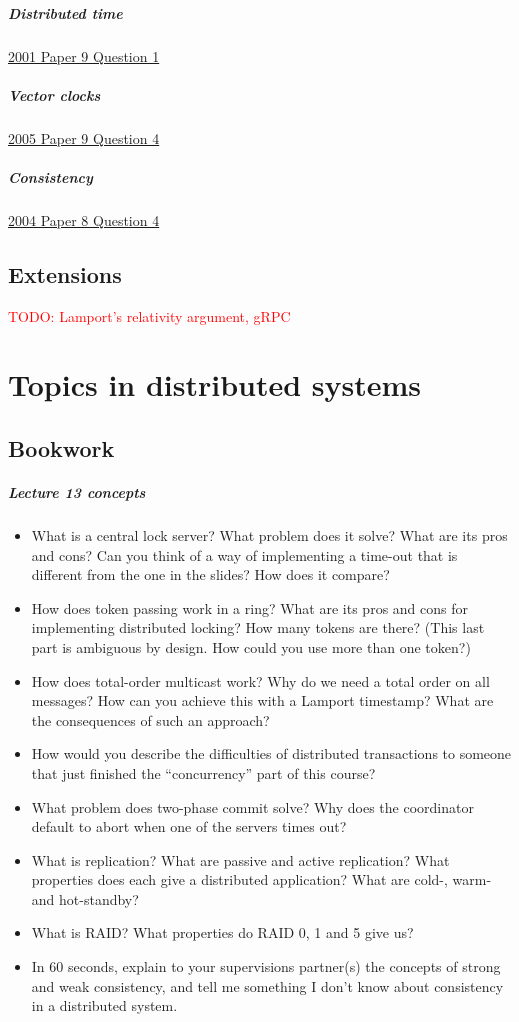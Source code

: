 \documentclass[12pt,a4paper,oneside,openright]{report}
\newcommand{\question}[2]{\paragraph{#1} #2}
\newcommand{\todo}[1]{\textcolor{red}{TODO: #1}}
\begin{document}
\question{Distributed
  time}{\href{https://www.cl.cam.ac.uk/teaching/exams/pastpapers/y2001p9q1.pdf}{2001
    Paper 9 Question 1}}

\question{Vector
  clocks}{\href{https://www.cl.cam.ac.uk/teaching/exams/pastpapers/y2005p9q4.pdf}{2005
    Paper 9 Question 4}}

\question{Consistency}{\href{https://www.cl.cam.ac.uk/teaching/exams/pastpapers/y2004p8q4.pdf}{2004
    Paper 8 Question 4}}

\section{Extensions}

\todo{Lamport's relativity argument, gRPC}

\chapter{Topics in distributed systems}

\section{Bookwork}

\question{Lecture 13 concepts}{
  \begin{itemize}
  \item What is a central lock server? What problem does it solve?
    What are its pros and cons? Can you think of a way of implementing
    a time-out that is different from the one in the slides? How does
    it compare?
  \item How does token passing work in a ring? What are its pros and
    cons for implementing distributed locking? How many tokens are
    there? (This last part is ambiguous by design. How could you use
    more than one token?)
  \item How does total-order multicast work? Why do we need a total
    order on all messages? How can you achieve this with a Lamport
    timestamp? What are the consequences of such an approach?
  \item How would you describe the difficulties of distributed
    transactions to someone that just finished the ``concurrency''
    part of this course?
  \item What problem does two-phase commit solve? Why does the
    coordinator default to abort when one of the servers times out?
  \item What is replication? What are passive and active replication?
    What properties does each give a distributed application? What are
    cold-, warm- and hot-standby?
  \item What is RAID? What properties do RAID 0, 1 and 5 give us?
  \item In 60 seconds, explain to your supervisions partner(s) the
    concepts of strong and weak consistency, and tell me something I
    don't know about consistency in a distributed system.
  \end{itemize}
}
\end{document}
